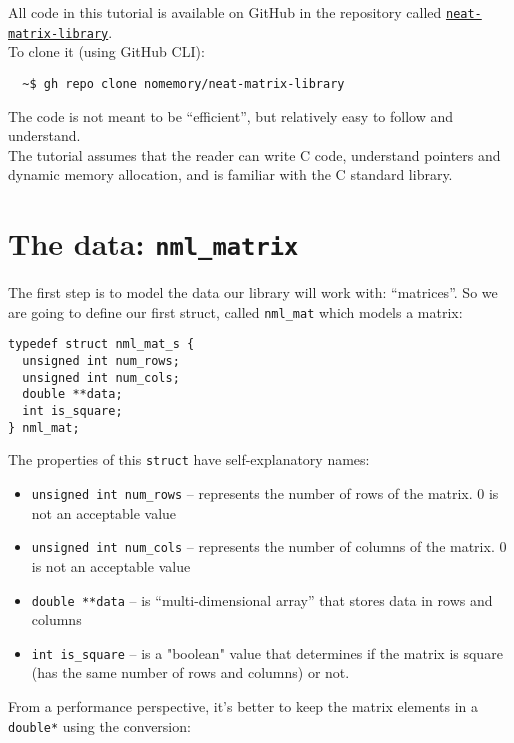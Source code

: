 All code in this tutorial is available on GitHub in the repository called \href{https://github.com/nomemory/neat-matrix-library}{\tt neat-matrix-library}.
\\

To clone it (using GitHub CLI):
\begin{verbatim}
  ~$ gh repo clone nomemory/neat-matrix-library
\end{verbatim}

The code is not meant to be “efficient”, but relatively easy to follow and understand.
\\

The tutorial assumes that the reader can write C code, understand pointers and dynamic memory allocation, and is familiar with the C standard library.
\\

\section{The data: {\tt nml\_matrix}}

The first step is to model the data our library will work with: “matrices”. So we are going to define our first struct, called {\tt nml\_mat} which models a matrix:

\begin{verbatim}
typedef struct nml_mat_s {
  unsigned int num_rows;
  unsigned int num_cols;
  double **data;
  int is_square;
} nml_mat;
\end{verbatim}
\hsep

The properties of this {\tt struct} have self-explanatory names:
\begin{itemize}
\item {\tt unsigned int num\_rows} -- represents the number of rows of the matrix. 0 is not an acceptable value

\item {\tt unsigned int num\_cols} -- represents the number of columns of the matrix. 0 is not an acceptable value

\item {\tt double **data} -- is “multi-dimensional array” that stores data in rows and columns

\item {\tt int is\_square} -- is a "boolean" value that determines if the matrix is square (has the same number of rows and columns) or not.
\end{itemize}

From a performance perspective, it’s better to keep the matrix elements in a {\tt double*} using the conversion:

